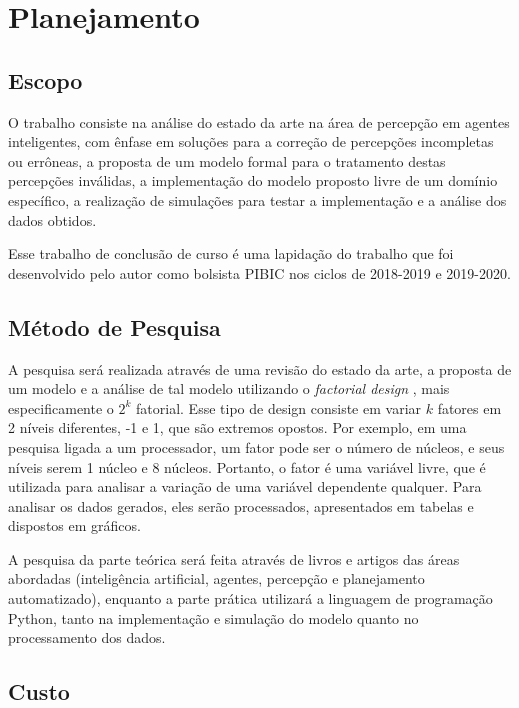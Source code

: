 \chapter{Planejamento}

\section{Escopo}

O trabalho consiste na análise do estado da arte na área de percepção em agentes inteligentes, com ênfase em soluções para a correção de percepções incompletas ou errôneas, a proposta de um modelo formal para o tratamento destas percepções inválidas, a implementação do modelo proposto livre de um domínio específico, a realização de simulações para testar a implementação e a análise dos dados obtidos.

Esse trabalho de conclusão de curso é uma lapidação do trabalho que foi desenvolvido pelo autor como bolsista PIBIC nos ciclos de 2018-2019 e 2019-2020.

\section{Método de Pesquisa}

A pesquisa será realizada através de uma revisão do estado da arte, a proposta de um modelo e a análise de tal modelo utilizando o \textit{factorial design} \cite{jain1990art}, mais especificamente o $2^k$ fatorial. Esse tipo de design consiste em variar $k$ fatores em 2 níveis diferentes, -1 e 1, que são extremos opostos. Por exemplo, em uma pesquisa ligada a um processador, um fator pode ser o número de núcleos, e seus níveis serem 1 núcleo e 8 núcleos. Portanto, o fator é uma variável livre, que é utilizada para analisar a variação de uma variável dependente qualquer. Para analisar os dados gerados, eles serão processados, apresentados em tabelas e dispostos em gráficos.

A pesquisa da parte teórica será feita através de livros e artigos das áreas abordadas (inteligência artificial, agentes, percepção e planejamento automatizado), enquanto a parte prática utilizará a linguagem de programação Python, tanto na implementação e simulação do modelo quanto no processamento dos dados.

\section{Custo}

